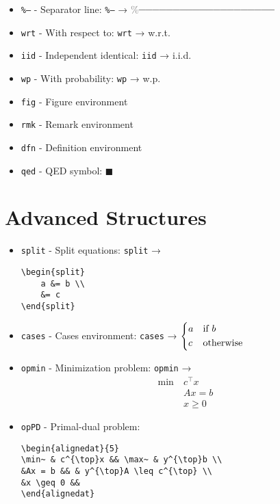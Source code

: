 \documentclass{article}
\newcommand{\snippet}[1]{\textcolor{titlebg}{\texttt{#1}}}
\newcommand{\example}[1]{\colorbox{codebg}{\texttt{#1}}}
\begin{document}
\begin{tcolorbox}[colback=cyan!5!white,colframe=cyan!75!black,title=Text Specific]
\begin{itemize}[leftmargin=*]
\item \snippet{\%--} - Separator line: \example{\%--} → \textcolor{gray}{\%────────────────────}
\item \snippet{wrt} - With respect to: \example{wrt} → w.r.t.
\item \snippet{iid} - Independent identical: \example{iid} → i.i.d.
\item \snippet{wp} - With probability: \example{wp} → w.p.
\item \snippet{fig} - Figure environment
\item \snippet{rmk} - Remark environment
\item \snippet{dfn} - Definition environment
\item \snippet{qed} - QED symbol: \(\blacksquare\)
\end{itemize}
\end{tcolorbox}

\section{Advanced Structures}

\begin{tcolorbox}[colback=violet!5!white,colframe=violet!75!black,title=Complex Structures]
\begin{itemize}[leftmargin=*]
\item \snippet{split} - Split equations:
\example{split} → 
\begin{verbatim}
\begin{split}
    a &= b \\
    &= c
\end{split}
\end{verbatim}

\item \snippet{cases} - Cases environment:
\example{cases} → 
\(\begin{dcases}
a & \text{if } b \\
c & \text{otherwise}
\end{dcases}\)

\item \snippet{opmin} - Minimization problem:
\example{opmin} → 
\[\begin{aligned}
\min~ & c^{\top}x \\
&Ax = b \\
&x \geq 0
\end{aligned}\]

\item \snippet{opPD} - Primal-dual problem:
\begin{verbatim}
\begin{alignedat}{5}
\min~ & c^{\top}x && \max~ & y^{\top}b \\
&Ax = b && & y^{\top}A \leq c^{\top} \\
&x \geq 0 && 
\end{alignedat}
\end{verbatim}
\end{itemize}
\end{tcolorbox}
\end{document}

